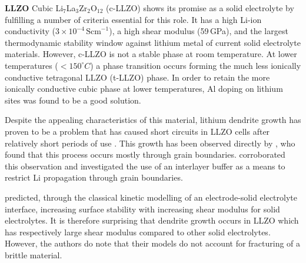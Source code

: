 \documentclass[../main.tex]{subfiles}
\begin{document}

\textbf{LLZO} Cubic Li$_7$La$_3$Zr$_2$O$_{12}$ (c-LLZO) shows its promise as a solid electrolyte by fulfilling a number of criteria essential for this role. It has a high Li-ion conductivity (\(3\times 10^{-4}\,\mathrm{Scm}^{-1}\))\cite{Murugan2007}, a high shear modulus (59\,GPa)\cite{Ni2012}, and the largest thermodynamic stability window against lithium metal\cite{Zhu2016, Binninger2020} of current solid electrolyte materials. However, c-LLZO is not a stable phase at room temperature.\cite{Geiger2011} At lower temperatures (\(<150 ^\circ C\)) a phase transition occurs forming the much less ionically conductive tetragonal LLZO (t-LLZO) phase.\cite{Geiger2011} In order to retain the more ionically conductive cubic phase at lower temperatures, Al doping on lithium sites was found to be a good solution.\cite{Geiger2011, Rangasamy2012}

Despite the appealing characteristics of this material, lithium dendrite growth has proven to be a problem that has caused short circuits in LLZO cells after relatively short periods of use \cite{Ren2015,Sudo2014}. This growth has been observed directly by \citeauthor{Cheng2017}, who found that this process occurs mostly through grain boundaries.\cite{Cheng2017} \citeauthor{Kim2020} corroborated this observation and investigated the use of an interlayer buffer as a means to restrict Li propagation through grain boundaries.\cite{Kim2020}

\citeauthor{Monroe2004} predicted, through the classical kinetic modelling of an electrode-solid electrolyte interface, increasing surface stability with increasing shear modulus for solid electrolytes.\cite{Monroe2004, Monroe2005} It is therefore surprising that dendrite growth occurs in LLZO which has respectively large shear modulus compared to other solid electrolytes. However, the authors do note that their models do not account for fracturing of a brittle material.
\end{document}
